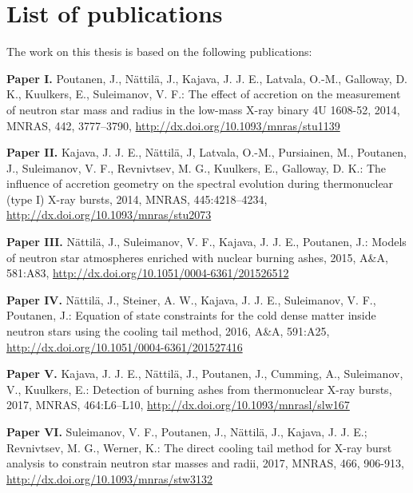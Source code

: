 \chapter*{List of publications}

The work on this thesis is based on the following publications:


\vspace{0.3cm}
\textbf{Paper I.} Poutanen, J., Nättilä, J., Kajava, J. J. E., Latvala, O.-M., Galloway, D. K., Kuulkers, E., Suleimanov, V. F.: The effect of accretion on the measurement of neutron star mass and radius in the low-mass X-ray binary 4U 1608-52, 2014, MNRAS, 442, 3777–3790, \url{http://dx.doi.org/10.1093/mnras/stu1139}

\vspace{0.3cm}
\textbf{Paper II.} Kajava, J. J. E., Nättilä, J, Latvala, O.-M., Pursiainen, M., Poutanen, J., Suleimanov, V. F., Revnivtsev, M. G., Kuulkers, E., Galloway, D. K.: The influence of accretion geometry on the spectral evolution during thermonuclear (type I) X-ray bursts, 2014, MNRAS, 445:4218–4234, \url{http://dx.doi.org/10.1093/mnras/stu2073}
 

\vspace{0.3cm}
\textbf{Paper III.} Nättilä, J., Suleimanov, V. F., Kajava, J. J. E., Poutanen, J.: Models of neutron star atmospheres enriched with nuclear burning ashes, 2015, A\&A, 581:A83, \url{http://dx.doi.org/10.1051/0004-6361/201526512}
 

\vspace{0.3cm}
\textbf{Paper IV.} Nättilä, J., Steiner, A. W., Kajava, J. J. E., Suleimanov, V. F., Poutanen, J.: Equation of state constraints for the cold dense matter inside neutron stars using the cooling tail method, 2016, A\&A, 591:A25, \url{http://dx.doi.org/10.1051/0004-6361/201527416}
 

\vspace{0.3cm}
\textbf{Paper V.} Kajava, J. J. E., Nättilä, J., Poutanen, J., Cumming, A., Suleimanov, V., Kuulkers, E.: Detection of burning ashes from thermonuclear X-ray bursts, 2017, MNRAS, 464:L6–L10, \url{http://dx.doi.org/10.1093/mnrasl/slw167}
 

\vspace{0.3cm}
\textbf{Paper VI.} Suleimanov, V. F., Poutanen, J., Nättilä, J., Kajava, J. J. E.; Revnivtsev, M. G., Werner, K.: The direct cooling tail method for X-ray burst analysis to constrain neutron star masses and radii, 2017, MNRAS, 466, 906-913, \url{http://dx.doi.org/10.1093/mnras/stw3132}
 


